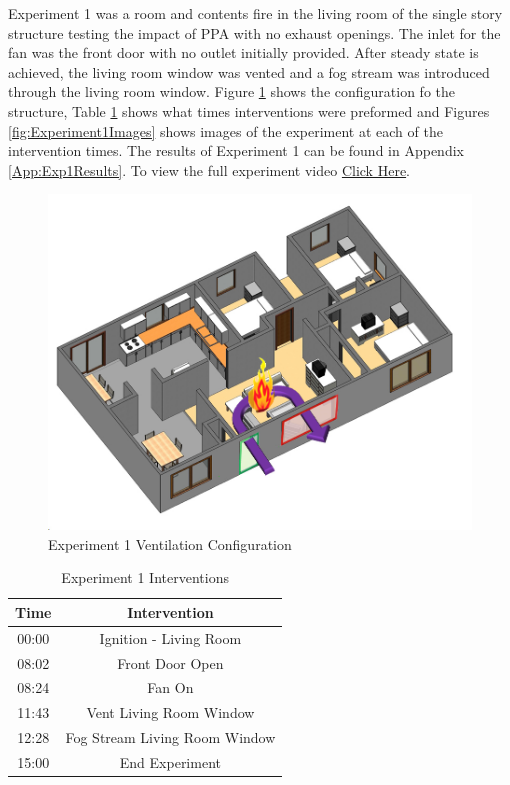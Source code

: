 \documentclass{article}
\begin{document}
Experiment 1 was a room and contents fire in the living room of the single story structure testing the impact of PPA with no exhaust openings. The inlet for the fan was the front door with no outlet initially provided. After steady state is achieved, the living room window was vented and a fog stream was introduced through the living room window. Figure \ref{fig:Exp1VentConfig} shows the configuration fo the structure, Table \ref{Table:Exp1Interventions} shows what times interventions were preformed and Figures \ref{fig:Experiment1Images} shows images of the experiment at each of the intervention times. The results of Experiment 1 can be found in Appendix \ref{App:Exp1Results}. To view the full experiment video \href{https://youtu.be/gl8rc1Nsl1k}{Click Here}.

\begin{figure}[H]
	\centering
	\includegraphics[width=5in]{0_Images/FireExperiments/Single_Story/Experiment_1.jpg}
	\caption{Experiment 1 Ventilation Configuration}
	\label{fig:Exp1VentConfig}
\end{figure}

\begin{table}[H]
	\centering
	\caption{Experiment 1 Interventions}
	\begin{tabular}{|c|c|} 
		\hline
		Time & Intervention \\ \hline \hline
		00:00 & Ignition - Living Room \\ \hline
		08:02 & Front Door Open \\ \hline
		08:24 & Fan On \\ \hline
		11:43 & Vent Living Room Window \\ \hline
		12:28 & Fog Stream Living Room Window \\ \hline
		15:00 & End Experiment\\ \hline
	\end{tabular}
	\label{Table:Exp1Interventions}
\end{table}
\end{document}
